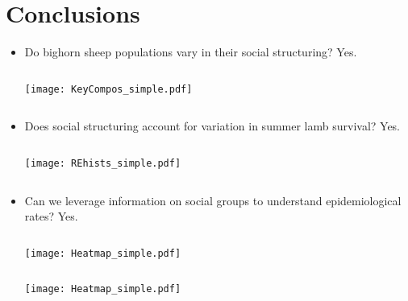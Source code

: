 \documentclass[fleqn,xcolor=table]{beamer}
\begin{document}
\section{Conclusions}
{
\begin{frame}[t]
	\begin{itemize}
		\item[] \color{navy} \footnotesize Do bighorn sheep populations vary in their social
			structuring?
			\color{darkred} Yes.
	\begin{columns}
			\texttt{[image: KeyCompos\_simple.pdf]}
			\vspace{.1in}
	\end{columns}
		\item[] \color{navy} \footnotesize Does social structuring account for variation in
			summer lamb survival?
			\color{darkred} Yes.
	\begin{columns}
		\column{.3\textwidth}
			\texttt{[image: REhists\_simple.pdf]}
			\vspace{.1in}
		\column{.7\textwidth}
	\end{columns}

			\vspace{.1in}
		\item[] \color{navy} \footnotesize Can we leverage
				information on social groups to understand 
			epidemiological rates?
			\color{darkred} Yes.

	\begin{columns}
			\texttt{[image: Heatmap\_simple.pdf]}
			\vspace{.1in}
	\end{columns}
			\texttt{[image: Heatmap\_simple.pdf]}
	\end{itemize}
\end{frame}
}
\end{document}

